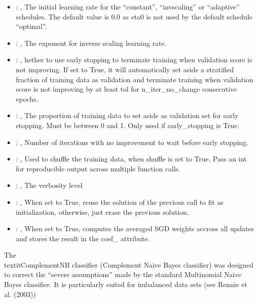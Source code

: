 \begin{itemize}
    \item {}: , 
      The initial learning rate for the ``constant'', ``invscaling'' or ``adaptive'' schedules. The
      default value is 0.0                                                  as eta0 is not used by
      the default schedule ``optimal''.

    \item {}: , 
      The exponent for inverse scaling learning rate.

    \item {}: , 
      hether to use early stopping to terminate training when validation score is not
      improving. If set to True, it will automatically set aside a stratified fraction of training
      data as validation and terminate training when validation score is not improving by at least
      tol for n\_iter\_no\_change consecutive epochs.

    \item {}: , 
      The proportion of training data to set aside as validation set for early stopping.
      Must be between 0 and 1. Only used if early\_stopping is True.

    \item {}: , 
      Number of iterations with no improvement to wait before early stopping.

    \item {}: , 
      Used to shuffle the training data, when shuffle is set to
      True. Pass an int for reproducible output across multiple function calls.

    \item {}: , 
      The verbosity level

    \item {}: , 
      When set to True, reuse the solution of the previous call
      to fit as initialization, otherwise, just erase the previous solution.

    \item {}: , 
      When set to True, computes the averaged SGD weights accross
      all updates and stores the result in the coef\_ attribute.
  \end{itemize}
 The \\textit{ComplementNB} classifier (Complement Naive Bayes classifier) was designed to correct
 the ``severe assumptions'' made by the standard Multinomial Naive Bayes classifier.
 It is particularly suited for imbalanced data sets (see Rennie et al. (2003))

